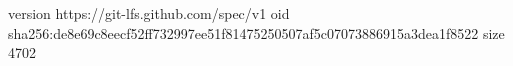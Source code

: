 version https://git-lfs.github.com/spec/v1
oid sha256:de8e69c8eecf52ff732997ee51f81475250507af5c07073886915a3dea1f8522
size 4702
